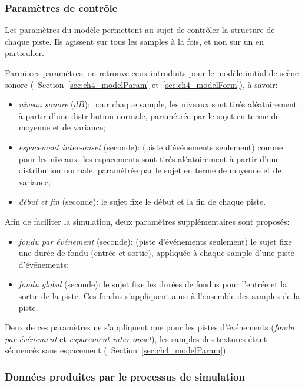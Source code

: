 \subsubsection{Paramètres de contrôle}
\label{sec:ch4_param}

Les paramètres du modèle permettent au sujet de contrôler la structure de chaque piste. Ils agissent sur tous les samples à la fois, et non sur un en particulier.

Parmi ces paramètres, on retrouve ceux introduits pour le modèle initial de scène sonore (\cf~Section~\ref{sec:ch4_modelParam} et~\ref{sec:ch4_modelForm}), à savoir:

\begin{itemize}
\item \emph{niveau sonore} ($dB$): pour chaque sample, les niveaux sont tirés aléatoirement à partir d'une distribution normale, paramétrée par le sujet en terme de moyenne et de variance;
\item \emph{espacement inter-onset} (seconde): (piste d'événements seulement) comme pour les niveaux, les espacements sont tirés aléatoirement à partir d'une distribution normale, paramétrée par le sujet en terme de moyenne et de variance;
\item \emph{début et fin} (seconde): le sujet fixe le début et la fin de chaque piste.
\end{itemize}

Afin de faciliter la simulation, deux paramètres supplémentaires sont proposés:

\begin{itemize}
\item \emph{fondu par événement} (seconde): (piste d'événements seulement) le sujet fixe une durée de fondu (entrée et sortie), appliquée à chaque sample d'une piste d'événements;
\item \emph{fondu global} (seconde): le sujet fixe les durées de fondus pour l'entrée et la sortie de la piste. Ces fondus s'appliquent ainsi à l'ensemble des samples de la piste.
\end{itemize}

Deux de ces paramètres ne s’appliquent que pour les pistes d'événements (\emph{fondu par événement} et \emph{espacement inter-onset}), les samples des textures étant séquencés sans espacement (\cf~Section~\ref{sec:ch4_modelParam})

\subsubsection{Données produites par le processus de simulation}

